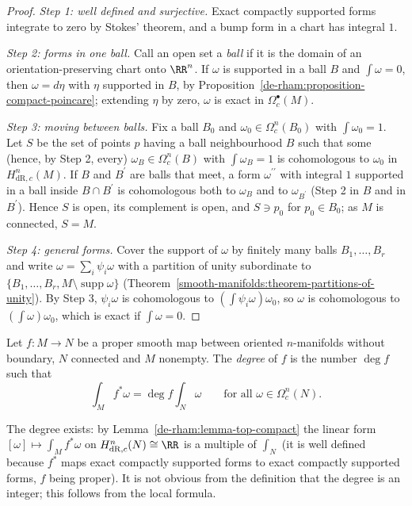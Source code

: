 \begin{proof}
\emph{Step 1: well defined and surjective.} Exact compactly supported forms integrate to zero by Stokes' theorem, and a bump form in a chart has integral $1$.

\emph{Step 2: forms in one ball.} Call an open set a \emph{ball} if it is the domain of an orientation-preserving chart onto $\RR^n$. If $\omega$ is supported in a ball $B$ and $\int\omega = 0$, then $\omega = d\eta$ with $\eta$ supported in $B$, by
Proposition~\ref{de-rham:proposition-compact-poincare}; extending $\eta$ by zero, $\omega$ is exact in $\Omega^\bullet_c(M)$.

\emph{Step 3: moving between balls.} Fix a ball $B_0$ and $\omega_0 \in \Omega^n_c(B_0)$ with $\int\omega_0 = 1$. Let $S$ be the set of points $p$ having a ball neighbourhood $B$ such that some (hence, by Step 2, every)
$\omega_B \in \Omega^n_c(B)$ with $\int\omega_B = 1$ is cohomologous to $\omega_0$ in $H^n_{\mathrm{dR},c}(M)$. If $B$ and $B^{\prime}$ are balls that meet, a form $\omega^{\prime\prime}$ with integral $1$ supported in a ball inside $B \cap B^{\prime}$ is
cohomologous both to $\omega_B$ and to $\omega_{B^{\prime}}$ (Step 2 in $B$ and in $B^{\prime}$). Hence $S$ is open, its complement is open, and $S \ni p_0$ for $p_0 \in B_0$; as $M$ is connected, $S = M$.

\emph{Step 4: general forms.} Cover the support of $\omega$ by finitely many balls $B_1, \ldots, B_r$ and write $\omega = \sum_i\psi_i\omega$ with a partition of unity subordinate to $\{B_1, \ldots, B_r, M \setminus \operatorname{supp}\omega\}$
(Theorem~\ref{smooth-manifolds:theorem-partitions-of-unity}). By Step 3, $\psi_i\omega$ is cohomologous to $(\int\psi_i\omega)\omega_0$, so $\omega$ is cohomologous to $(\int\omega)\omega_0$, which is exact if $\int\omega = 0$.
\end{proof}

\begin{definition}\label{de-rham:definition-degree}
Let $f \colon M \to N$ be a proper smooth map between oriented $n$-manifolds without boundary, $N$ connected and $M$ nonempty. The \emph{degree} of $f$ is the number $\deg f$ such that
\[
\int_Mf^*\omega = \deg f\int_N\omega \qquad \text{for all } \omega \in \Omega^n_c(N).
\]
\end{definition}

The degree exists: by Lemma~\ref{de-rham:lemma-top-compact} the linear form $[\omega] \mapsto \int_Mf^*\omega$ on $H^n_{\mathrm{dR},c}(N) \cong \RR$ is a multiple of $\int_N$ (it is well defined because $f^*$ maps exact
compactly supported forms to exact compactly supported forms, $f$ being proper). It is not obvious from the definition that the degree is an integer; this follows from the local formula.

